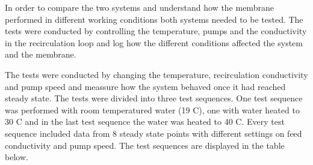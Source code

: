 In order to compare the two systems and understand how the membrane performed in different working conditions both systems needed to be tested. The tests were conducted by controlling the temperature, pumps and the conductivity in the recirculation loop and log how the different conditions affected the system and the membrane. 

The tests were conducted by changing the temperature, recirculation conductivity and pump speed and meassure how the system behaved once it had reached steady state. The tests were divided into three test sequences. One test sequence was performed with room temperatured water (19 C), one with water heated to 30 C and in the last test sequence the water was heated to 40 C. Every test sequence included data from 8 steady state points with different settings on feed conductivity and pump speed. The test sequences are displayed in the table below. 

